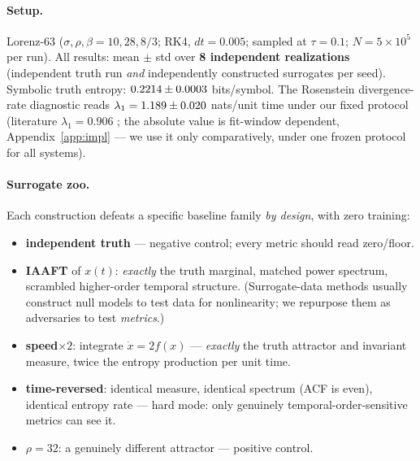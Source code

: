 \documentclass[11pt]{article}
\begin{document}
\paragraph{Setup.} Lorenz-63 \citep{lorenz1963deterministic}
($\sigma,\rho,\beta = 10,28,8/3$; RK4, $dt=0.005$; sampled at $\tau=0.1$;
$N=5\times10^5$ per run). All results: mean $\pm$ std over \textbf{8 independent
realizations} (independent truth run \emph{and} independently constructed surrogates
per seed). Symbolic truth entropy: $0.2214 \pm 0.0003$ bits/symbol. The Rosenstein divergence-rate
diagnostic reads $\lambda_1=1.189 \pm 0.020$ nats/unit time under our fixed protocol
(literature $\lambda_1=0.906$ \citep{rosenstein1993practical,eckmann1985ergodic}; the
absolute value is fit-window dependent, Appendix~\ref{app:impl} --- we use it only
comparatively, under one frozen protocol for all systems).

\paragraph{Surrogate zoo.} Each construction defeats a specific baseline family
\emph{by design}, with zero training:
\begin{itemize}\itemsep2pt
\item \textbf{independent truth} --- negative control; every metric should read zero/floor.
\item \textbf{IAAFT} \citep{schreiber1996improved,theiler1992testing} of $x(t)$:
\emph{exactly} the truth marginal, matched power spectrum, scrambled higher-order
temporal structure. (Surrogate-data methods usually construct null models to test data
for nonlinearity; we repurpose them as adversaries to test \emph{metrics}.)
\item \textbf{speed$\times2$}: integrate $\dot x=2f(x)$ --- \emph{exactly} the truth
attractor and invariant measure, twice the entropy production per unit time.
\item \textbf{time-reversed}: identical measure, identical spectrum (ACF is even),
identical entropy rate --- hard mode: only genuinely temporal-order-sensitive metrics
can see it.
\item \textbf{$\rho=32$}: a genuinely different attractor --- positive control.
\end{itemize}
\end{document}
